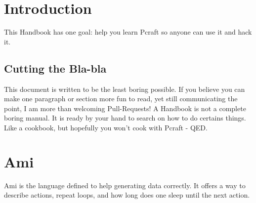 \documentclass[10pt]{article}
\begin{document}
\newpage

\tableofcontents

\newpage

\section{Introduction}

This Handbook has one goal: help you learn Pcraft so anyone can use it and hack it.

\subsection{Cutting the Bla-bla}

This document is written to be the least boring possible. If you believe you can make one paragraph or section more fun to read, yet still communicating the point, I am more than welcoming Pull-Requests! A Handbook is not a complete boring manual. It is ready by your hand to search on how to do certains things. Like a cookbook, but hopefully you won't cook with Pcraft - QED.


\section{Ami}

Ami is the language defined to help generating data correctly. It offers a way to describe actions, repeat loops, and how long does one sleep until the next action.
\end{document}
